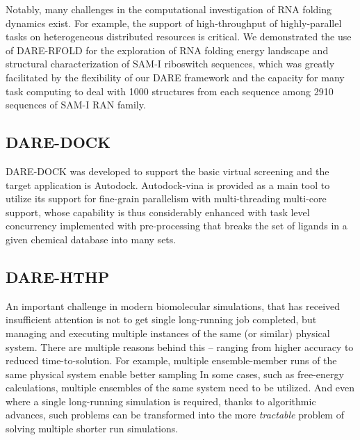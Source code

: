 \documentclass{sig-alternate}
\begin{document}
Notably, many challenges in the computational investigation of RNA folding dynamics exist.  For example, the support of high-throughput of highly-parallel tasks on heterogeneous distributed resources is critical.
We demonstrated the use of DARE-RFOLD for the exploration of RNA folding energy landscape and structural characterization of SAM-I riboswitch sequences, which was greatly facilitated by the flexibility of our DARE framework and the capacity for many task computing to deal with 1000 structures from each sequence among 2910 sequences of SAM-I RAN family\cite{ecmls10}. 


\subsection{DARE-DOCK}
DARE-DOCK was developed to support the basic virtual screening and the target application is Autodock\cite{autodock}.  Autodock-vina is provided as a main tool to utilize its support for fine-grain parallelism with multi-threading multi-core support, whose capability is thus considerably enhanced with task level concurrency implemented with pre-processing that breaks the set of ligands in a given chemical database into many sets\cite{autodock-vina}.  

%

\subsection{DARE-HTHP}

An important challenge in modern biomolecular simulations, that has
received insufficient attention is not to get single long-running job
completed, but managing and executing multiple instances of the same
(or similar) physical system.  There are multiple reasons behind this
-- ranging from higher accuracy to reduced time-to-solution. For
example, multiple ensemble-member runs of the same physical system
enable better sampling In some cases, such as free-energy
calculations, multiple ensembles of the same system need to be
utilized. And even where a single long-running simulation is required,
thanks to algorithmic advances, such problems can be transformed into
the more {\it tractable} problem of solving multiple shorter run
simulations.
\end{document}
